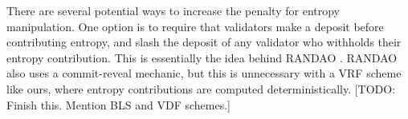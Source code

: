 There are several potential ways to increase the penalty for entropy manipulation. One option is to require that validators make a deposit before contributing entropy, and slash the deposit of any validator who withholds their entropy contribution. This is essentially the idea behind RANDAO \cite{randao}. RANDAO also uses a commit-reveal mechanic, but this is unnecessary with a VRF scheme like ours, where entropy contributions are computed deterministically. [TODO: Finish this. Mention BLS and VDF schemes.]


